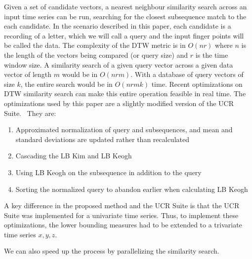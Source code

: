 Given a set of candidate vectors, a nearest neighbour similarity search across an input time series can be run, searching for the closest subsequence match to the each candidate. In the scenario described in this paper, each candidate is a recording of a letter, which we will call a query and the input finger points will be called the data.
The complexity of the DTW metric is in $O(nr)$ where $n$ is the length of the vectors being compared (or query size) and $r$ is the time window size. A similarity search of a given query vector across a given data vector of length $m$ would be in $O(nrm)$. With a database of query vectors of size $k$, the entire search would be in $O(nrmk)$ time.
Recent optimizations on DTW similarity search can make this entire operation feasible in real time. The optimizations used by this paper are a slightly modified version of the UCR Suite.~\cite{rakthanmanon2012searching}
 They are: 
\begin{enumerate}
\item
Approximated normalization of query and subsequences, and mean and standard deviations are updated rather than recalculated
\item
Cascading the LB Kim and LB Keogh
\item
Using LB Keogh on the subsequence in addition to the query
\item
Sorting the normalized query to abandon earlier when calculating LB Keogh
\end{enumerate}
A key difference in the proposed method and the UCR Suite is that the UCR Suite was implemented for a univariate time series. Thus, to implement these optimizations, the lower bounding measures had to be extended to a trivariate time series ${x,y,z}$.~\cite{rath2002lower-bounding}

We can also speed up the process by parallelizing the similarity search.
